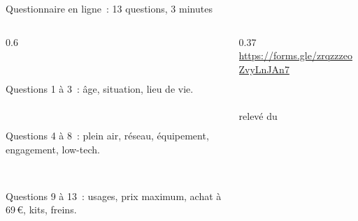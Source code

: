 \begin{frame}{Questionnaire en ligne~: 13 questions, 3 minutes}
  \begin{columns}[T]
    \begin{column}{0.6\textwidth}
      \begin{carte}[height=0.9cm,valign=top,colback=insarose]
        \raggedright{}\\[1pt]
        {\scriptsize Questions 1 à 3~: âge, situation, lieu de vie.\par}
      \end{carte}
      \vspace{0.03cm}
      \begin{carte}[height=0.9cm,valign=top]
        \raggedright{}\\[1pt]
        {\scriptsize Questions 4 à 8~: plein air, réseau, équipement, engagement, low-tech.\par}
      \end{carte}
      \vspace{0.03cm}
      \begin{carte}[height=0.9cm,valign=top]
        \raggedright{}\\[1pt]
        {\scriptsize Questions 9 à 13~: usages, prix maximum, achat à 69\,€, kits, freins.\par}
      \end{carte}
    \end{column}
    \begin{column}{0.37\textwidth}
      \centering
      \ifdefined\qrcode
        \\[3pt]
      \fi
      {\scriptsize\url{https://forms.gle/zrqzzzeoZvyLnJAn7}}\\[3pt]
      \begin{carte}[height=1.0cm,valign=top]
        \centering{}\\[1pt]
        {\scriptsize relevé du \fqdate\par}
      \end{carte}
    \end{column}
  \end{columns}
  \vspace{0.02cm}

\end{frame}
